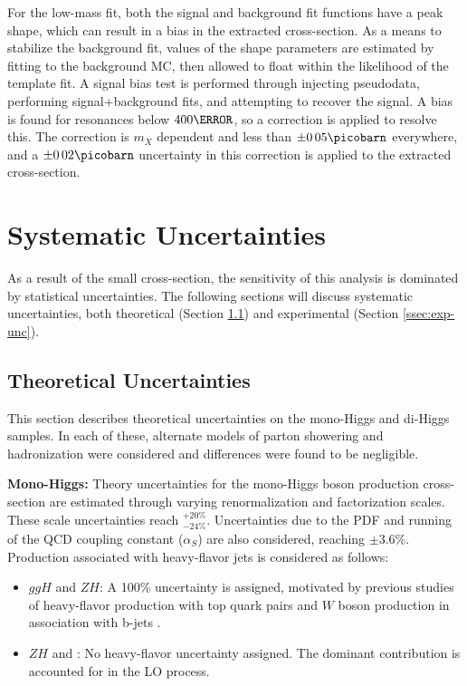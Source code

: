 For the low-mass fit, both the signal and background fit functions have a peak shape, which can result in a bias in the extracted cross-section. As a means to stabilize the background fit, values of the shape parameters are estimated by fitting to the background \gls{MC}, then allowed to float within the likelihood of the template fit. A signal bias test is performed through injecting pseudodata, performing signal+background fits, and attempting to recover the signal. A bias is found for resonances below $\unit{400}{\GeV}$, so a correction is applied to resolve this. The correction is $m_{X}$ dependent and less than $\pm\unit{0.05}{\picobarn}$ everywhere, and a $\pm\unit{0.02}{\picobarn}$ uncertainty in this correction is applied to the extracted cross-section.

\section{Systematic Uncertainties}

As a result of the small \hh cross-section, the sensitivity of this analysis is dominated by statistical uncertainties. The following sections will discuss systematic uncertainties, both theoretical (Section \ref{ssec:theory-unc}) and experimental (Section \ref{ssec:exp-unc}).

\subsection{Theoretical Uncertainties} \label{ssec:theory-unc}

This section describes theoretical uncertainties on the mono-Higgs and di-Higgs samples. In each of these, alternate models of parton showering and hadronization were considered and differences were found to be negligible.

\noindent\textbf{Mono-Higgs:} Theory uncertainties for the mono-Higgs boson production cross-section are estimated through varying renormalization and factorization scales. These scale uncertainties reach $^{+20\%}_{-24\%}$. Uncertainties due to the \gls{PDF} and running of the \gls{QCD} coupling constant ($\alpha_{S}$) are also considered, reaching $\pm3.6\%$. Production associated with heavy-flavor jets is considered as follows:

\begin{itemize}
  \item $ggH$ and $ZH$: A 100\% uncertainty is assigned, motivated by previous studies of heavy-flavor production with top quark pairs \cite{heavy-flavor-top} and $W$ boson production in association with b-jets \cite{heavy-flavor-W}.
  \item $ZH$ and \tth: No heavy-flavor uncertainty assigned. The dominant contribution is accounted for in the \gls{LO} process.
\end{itemize}

